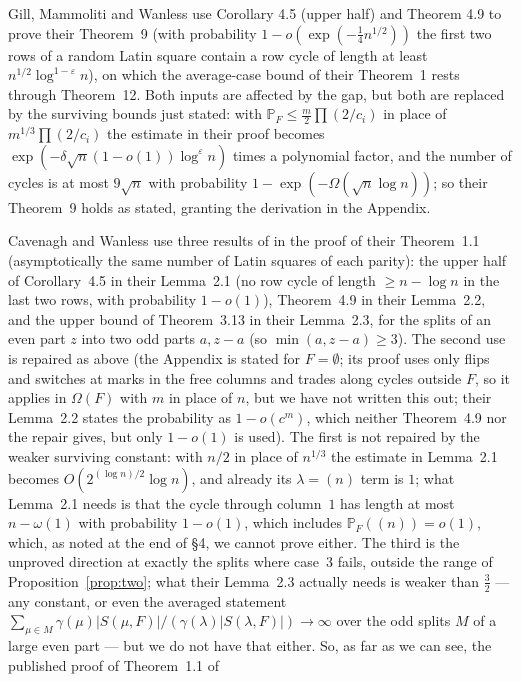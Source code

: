 \documentclass[11pt]{article}
\theoremstyle{remark}
\newcommand{\PP}{\mathbb P}
\begin{document}
Gill, Mammoliti and Wanless
\cite{GMW25} use Corollary 4.5 (upper half) and Theorem 4.9 to prove
their Theorem~9 (with probability $1-o(\exp(-\tfrac14n^{1/2}))$ the first
two rows of a random Latin square contain a row cycle of length at least
$n^{1/2}\log^{1-\varepsilon}n$), on which the average-case bound of their
Theorem~1 rests through Theorem~12.  Both inputs are affected by the
gap, but both are replaced by the surviving bounds just stated: with
$\PP_F\le\tfrac m2\prod(2/c_i)$ in place of $m^{1/3}\prod(2/c_i)$ the
estimate in their proof becomes $\exp(-\delta\sqrt n(1-o(1))\log^\varepsilon n)$
times a polynomial factor, and the number of cycles is at most
$9\sqrt n$ with probability $1-\exp(-\Omega(\sqrt n\log n))$; so their
Theorem~9 holds as stated, granting the derivation in the Appendix.

Cavenagh and Wanless \cite{CW16} use three results of \cite{CGW08} in
the proof of their Theorem~1.1 (asymptotically the same number of Latin
squares of each parity): the upper half of Corollary~4.5 in their
Lemma~2.1 (no row cycle of length $\ge n-\log n$ in the last two rows,
with probability $1-o(1)$), Theorem~4.9 in their Lemma~2.2, and the
upper bound of Theorem~3.13 in their Lemma~2.3, for the splits of an
even part $z$ into two odd parts $a,z-a$ (so $\min(a,z-a)\ge3$).  The
second use is repaired as above (the Appendix is stated for
$F=\emptyset$; its proof uses only flips and switches at marks in the
free columns and trades along cycles outside $F$, so it applies in
$\Omega(F)$ with $m$ in place of $n$, but we have not written this out;
their Lemma~2.2 states the probability as $1-o(c^m)$, which neither
Theorem~4.9 nor the repair gives, but only $1-o(1)$ is used).
The first is not repaired by the weaker surviving constant: with $n/2$ in
place of $n^{1/3}$ the estimate in Lemma~2.1 becomes
$O(2^{(\log n)/2}\log n)$, and already its $\lambda=(n)$ term is $1$; what
Lemma~2.1 needs is that the cycle through column~$1$ has length at
most $n-\omega(1)$ with probability $1-o(1)$, which includes
$\PP_F((n))=o(1)$, which, as noted at the end of \S4, we cannot prove either.  The third is the unproved direction
at exactly the splits where case~3 fails, outside the range of
Proposition~\ref{prop:two}; what their Lemma~2.3 actually needs is
weaker than $\tfrac32$ --- any constant, or even the averaged statement
$\sum_{\mu\in M}\gamma(\mu)|S(\mu,F)|/(\gamma(\lambda)|S(\lambda,F)|)\to\infty$
over the odd splits $M$ of a large even part --- but we do not have
that either.  So, as far as we can see, the published proof of Theorem~1.1 of
\end{document}

